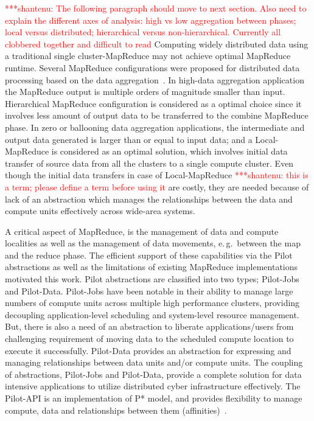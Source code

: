 \documentclass{acm_proc_article-sp}
\newcommand{\jhanote}[1]{ {\textcolor{red} { ***shantenu: #1 }}}
\newcommand{\jhanote}[1]{}
\begin{document}


\jhanote{The following paragraph should move to next section. Also
  need to explain the different axes of analysis: high vs low
  aggregation between phases; local versus distributed; hierarchical
  versus non-hierarchical. Currently all clobbered together and
  difficult to read} Computing widely distributed data using a traditional single cluster-MapReduce
may not achieve optimal MapReduce runtime. Several MapReduce configurations were
proposed for distributed data processing based on the data
aggregation~\cite{weissman-mr-11}. In high-data aggregation application the
MapReduce output is multiple orders of magnitude smaller than input.
Hierarchical MapReduce configuration is considered as a optimal choice since it
involves less amount of output data to be transferred to the combine MapReduce
phase. In zero or ballooning data aggregation applications, the intermediate and
output data generated is larger than or equal to input data; and a
Local-MapReduce is considered as an optimal solution, which involves initial
data transfer of source data from all the clusters to a single compute cluster.
Even though the initial data transfers in case of Local-MapReduce \jhanote{this
is a term; please define a term before using it} are costly, they are needed
because of lack of an abstraction which manages the relationships between the
data and compute units effectively across wide-area systems.

A critical aspect of MapReduce, is the management of data and compute localities
as well as the management of data movements, e.\,g.\ between the map and the
reduce phase. The efficient support of these capabilities via the Pilot
abstractions as well as the limitations of existing MapReduce implementations
motivated this work. Pilot abstractions are classified into two types;
Pilot-Jobs and Pilot-Data. Pilot-Jobs have been notable in their ability to
manage large numbers of compute units across multiple high performance clusters,
providing decoupling application-level scheduling and system-level resource
management. But, there is also a need of an abstraction to liberate
applications/users from challenging requirement of moving data to the scheduled
compute location to execute it successfully. Pilot-Data provides an abstraction
for expressing and managing relationships between data units and/or compute
units. The coupling of abstractions, Pilot-Jobs and Pilot-Data, provide a
complete solution for data intensive applications to utilize distributed cyber
infrastructure effectively. The Pilot-API is an implementation of P* model, and
provides flexibility to manage compute, data and relationships between them
(affinities)~\cite{pstar-2012}.
\end{document}
